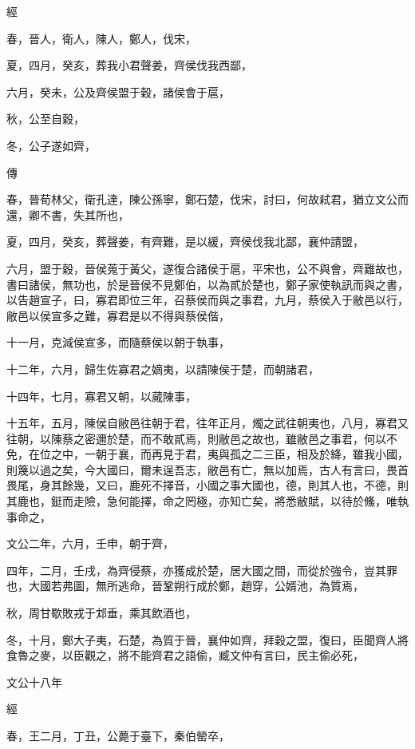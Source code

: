 \documentclass{ctexart}
\begin{document}
經



春，晉人，衛人，陳人，鄭人，伐宋，

夏，四月，癸亥，葬我小君聲姜，齊侯伐我西鄙，

六月，癸未，公及齊侯盟于穀，諸侯會于扈，

秋，公至自穀，

冬，公子遂如齊，

傳



春，晉荀林父，衛孔達，陳公孫寧，鄭石楚，伐宋，討曰，何故弒君，猶立文公而還，卿不書，失其所也，

夏，四月，癸亥，葬聲姜，有齊難，是以緩，齊侯伐我北鄙，襄仲請盟，

六月，盟于穀，晉侯蒐于黃父，遂復合諸侯于扈，平宋也，公不與會，齊難故也，書曰諸侯，無功也，於是晉侯不見鄭伯，以為貳於楚也，鄭子家使執訊而與之書，以告趙宣子，曰，寡君即位三年，召蔡侯而與之事君，九月，蔡侯入于敝邑以行，敝邑以侯宣多之難，寡君是以不得與蔡侯偕，

十一月，克減侯宣多，而隨蔡侯以朝于執事，

十二年，六月，歸生佐寡君之嫡夷，以請陳侯于楚，而朝諸君，

十四年，七月，寡君又朝，以蕆陳事，

十五年，五月，陳侯自敝邑往朝于君，往年正月，燭之武往朝夷也，八月，寡君又往朝，以陳蔡之密邇於楚，而不敢貳焉，則敝邑之故也，雖敝邑之事君，何以不免，在位之中，一朝于襄，而再見于君，夷與孤之二三臣，相及於絳，雖我小國，則篾以過之矣，今大國曰，爾未逞吾志，敝邑有亡，無以加焉，古人有言曰，畏首畏尾，身其餘幾，又曰，鹿死不擇音，小國之事大國也，德，則其人也，不德，則其鹿也，鋌而走險，急何能擇，命之罔極，亦知亡矣，將悉敝賦，以待於鯈，唯執事命之，

文公二年，六月，壬申，朝于齊，

四年，二月，壬戌，為齊侵蔡，亦獲成於楚，居大國之間，而從於強令，豈其罪也，大國若弗圖，無所逃命，晉鞏朔行成於鄭，趙穿，公婿池，為質焉，

秋，周甘歜敗戎于邥垂，乘其飲酒也，

冬，十月，鄭大子夷，石楚，為質于晉，襄仲如齊，拜穀之盟，復曰，臣聞齊人將食魯之麥，以臣觀之，將不能齊君之語偷，臧文仲有言曰，民主偷必死，





文公十八年


經



春，王二月，丁丑，公薨于臺下，秦伯罃卒，
\end{document}
